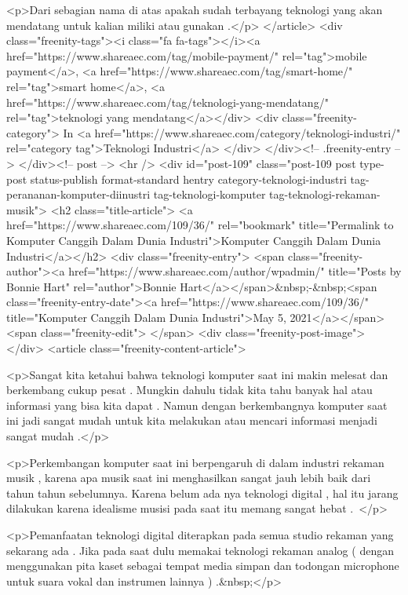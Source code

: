 <p>Dari sebagian nama di atas apakah sudah terbayang teknologi yang akan mendatang untuk kalian miliki atau gunakan .</p>
									</article>
																			<div class="freenity-tags"><i class="fa fa-tags"></i><a href="https://www.shareaec.com/tag/mobile-payment/" rel="tag">mobile payment</a>, <a href="https://www.shareaec.com/tag/smart-home/" rel="tag">smart home</a>, <a href="https://www.shareaec.com/tag/teknologi-yang-mendatang/" rel="tag">teknologi yang mendatang</a></div>
																			<div class="freenity-category">
											In <a href="https://www.shareaec.com/category/teknologi-industri/" rel="category tag">Teknologi Industri</a>										</div>
																	</div><!-- .freenity-entry -->
							</div><!-- post -->
							<hr />
													<div id="post-109" class="post-109 post type-post status-publish format-standard hentry category-teknologi-industri tag-perananan-komputer-diinustri tag-teknologi-komputer tag-teknologi-rekaman-musik">
								<h2 class="title-article">
									<a href="https://www.shareaec.com/109/36/" rel="bookmark" title="Permalink to Komputer Canggih Dalam Dunia Industri">Komputer Canggih Dalam Dunia Industri</a></h2>
								<div class="freenity-entry">
									<span class="freenity-author"><a href="https://www.shareaec.com/author/wpadmin/" title="Posts by Bonnie Hart" rel="author">Bonnie Hart</a></span>&nbsp;-&nbsp;<span class="freenity-entry-date"><a href="https://www.shareaec.com/109/36/" title="Komputer Canggih Dalam Dunia Industri">May 5, 2021</a></span>
									<span class="freenity-edit"> </span>
									<div class="freenity-post-image">  </div>
																		<article class="freenity-content-article">
										
<p>Sangat kita ketahui bahwa teknologi komputer saat ini makin melesat dan berkembang cukup pesat . Mungkin dahulu tidak kita tahu banyak hal atau informasi yang bisa kita dapat . Namun dengan berkembangnya komputer saat ini jadi sangat mudah untuk kita melakukan atau mencari informasi menjadi sangat mudah .</p>



<p>Perkembangan komputer saat ini berpengaruh di dalam industri rekaman musik , karena apa musik saat ini menghasilkan sangat jauh lebih baik dari tahun tahun sebelumnya. Karena belum ada nya teknologi digital , hal itu jarang dilakukan karena idealisme musisi pada saat itu memang sangat hebat . </p>



<p>Pemanfaatan teknologi digital diterapkan pada semua studio rekaman yang sekarang ada . Jika pada saat dulu memakai teknologi rekaman analog ( dengan menggunakan pita kaset sebagai tempat media simpan dan todongan microphone untuk suara vokal dan instrumen lainnya ) .&nbsp;</p>



